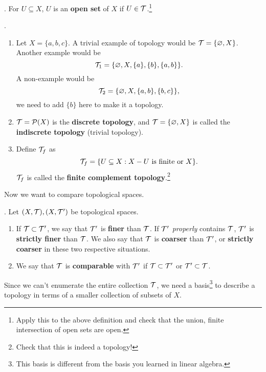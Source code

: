 .  For \(U \subseteq X\), \(U\) is an \textbf{open set} of \(X\) if \(U \in \mathcal{T}\).\footnote{Apply this to the above definition and check that the union, finite intersection of open sets are open.}

\ex.
\begin{enumerate}
    \item Let \(X = \{a, b, c\}\). A trivial example of topology would be \(\mathcal{T} = \{\varnothing, X\}\). Another example would be
          \[
              \mathcal{T}_1 = \{\varnothing, X, \{a\}, \{b\}, \{a, b\}\}.
          \]
          A non-example would be
          \[
              \mathcal{T}_2 = \{\varnothing, X, \{a, b\}, \{b, c\}\},
          \]
          we need to add \(\{b\}\) here to make it a topology.
    \item \(\mathcal{T} = \mathcal{P}(X)\) is the \textbf{discrete topology}, and \(\mathcal{T} = \{\varnothing, X\}\) is called the \textbf{indiscrete topology} (trivial topology).
    \item Define \(\mathcal{T}_f\) as
          \[
              \mathcal{T}_f = \{U \subseteq X : X - U \text{ is finite or } X\}.
          \]
          \(\mathcal{T}_f\) is called the \textbf{finite complement topology}.\footnote{Check that this is indeed a topology!}
\end{enumerate}

Now we want to compare topological spaces.

. Let \((X, \mathcal{T}), (X, \mathcal{T'})\) be topological spaces.
\begin{enumerate}
    \item If \(\mathcal{T} \subset \mathcal{T'}\), we say that \(\mathcal{T'}\) is \textbf{finer} than \(\mathcal{T}\). If \(\mathcal{T}'\) \textit{properly} contains \(\mathcal{T}\), \(\mathcal{T'}\) is \textbf{strictly finer} than \(\mathcal{T}\). We also say that \(\mathcal{T}\) is \textbf{coarser} than \(\mathcal{T}'\), or \textbf{strictly coarser} in these two respective situations.
    \item We say that \(\mathcal{T}\) is \textbf{comparable} with \(\mathcal{T'}\) if \(\mathcal{T} \subset \mathcal{T}'\) or \(\mathcal{T}' \subset \mathcal{T}\).
\end{enumerate}

\pagebreak


Since we can't enumerate the entire collection \(\mathcal{T}\), we need a basis\footnote{This basis is different from the basis you learned in linear algebra.} to describe a topology in terms of a smaller collection of subsets of \(X\).

